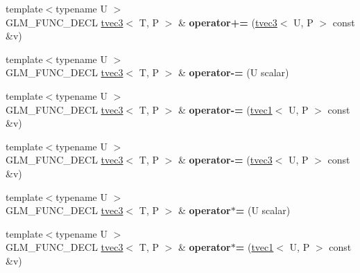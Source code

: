 \begin{DoxyCompactItemize}
\item 
\hypertarget{structglm_1_1tvec3_aca33e625fbb5231fe04a31a3f6ac7d9c}{{\footnotesize template$<$typename U $>$ }\\G\-L\-M\-\_\-\-F\-U\-N\-C\-\_\-\-D\-E\-C\-L \hyperlink{structglm_1_1tvec3}{tvec3}$<$ T, P $>$ \& {\bfseries operator+=} (\hyperlink{structglm_1_1tvec3}{tvec3}$<$ U, P $>$ const \&v)}\label{structglm_1_1tvec3_aca33e625fbb5231fe04a31a3f6ac7d9c}

\item 
\hypertarget{structglm_1_1tvec3_adfb7d908bd3a5fe2e176a7e806008de6}{{\footnotesize template$<$typename U $>$ }\\G\-L\-M\-\_\-\-F\-U\-N\-C\-\_\-\-D\-E\-C\-L \hyperlink{structglm_1_1tvec3}{tvec3}$<$ T, P $>$ \& {\bfseries operator-\/=} (U scalar)}\label{structglm_1_1tvec3_adfb7d908bd3a5fe2e176a7e806008de6}

\item 
\hypertarget{structglm_1_1tvec3_a8ebee86f6ea622e744ecedaf7e7db9ff}{{\footnotesize template$<$typename U $>$ }\\G\-L\-M\-\_\-\-F\-U\-N\-C\-\_\-\-D\-E\-C\-L \hyperlink{structglm_1_1tvec3}{tvec3}$<$ T, P $>$ \& {\bfseries operator-\/=} (\hyperlink{structglm_1_1tvec1}{tvec1}$<$ U, P $>$ const \&v)}\label{structglm_1_1tvec3_a8ebee86f6ea622e744ecedaf7e7db9ff}

\item 
\hypertarget{structglm_1_1tvec3_a356d8232f5a66a5e971ab1cb46593722}{{\footnotesize template$<$typename U $>$ }\\G\-L\-M\-\_\-\-F\-U\-N\-C\-\_\-\-D\-E\-C\-L \hyperlink{structglm_1_1tvec3}{tvec3}$<$ T, P $>$ \& {\bfseries operator-\/=} (\hyperlink{structglm_1_1tvec3}{tvec3}$<$ U, P $>$ const \&v)}\label{structglm_1_1tvec3_a356d8232f5a66a5e971ab1cb46593722}

\item 
\hypertarget{structglm_1_1tvec3_ad3afa22d5db30fd87b72f0d1daec6e3a}{{\footnotesize template$<$typename U $>$ }\\G\-L\-M\-\_\-\-F\-U\-N\-C\-\_\-\-D\-E\-C\-L \hyperlink{structglm_1_1tvec3}{tvec3}$<$ T, P $>$ \& {\bfseries operator$\ast$=} (U scalar)}\label{structglm_1_1tvec3_ad3afa22d5db30fd87b72f0d1daec6e3a}

\item 
\hypertarget{structglm_1_1tvec3_a8bf034f6ec15f8a4d316338cbe30d727}{{\footnotesize template$<$typename U $>$ }\\G\-L\-M\-\_\-\-F\-U\-N\-C\-\_\-\-D\-E\-C\-L \hyperlink{structglm_1_1tvec3}{tvec3}$<$ T, P $>$ \& {\bfseries operator$\ast$=} (\hyperlink{structglm_1_1tvec1}{tvec1}$<$ U, P $>$ const \&v)}\label{structglm_1_1tvec3_a8bf034f6ec15f8a4d316338cbe30d727}


\end{DoxyCompactItemize}
